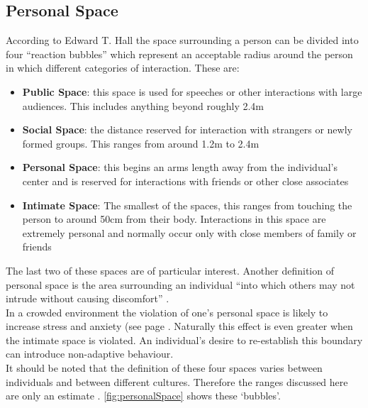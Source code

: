 \subsection{Personal Space}
\label{Res:subsec:personalSpace}
According to Edward T. Hall \cite{HiddenDimension} the space surrounding a person can be divided into four ``reaction bubbles'' which represent an acceptable radius around the person in which different categories of interaction. These are:
\begin{itemize}
  \item{\textbf{Public Space}: this space is used for speeches or other interactions with large audiences. This includes anything beyond roughly 2.4m}
  \item{\textbf{Social Space}: the distance reserved for interaction with strangers or newly formed groups. This ranges from around 1.2m to 2.4m}
  \item{\textbf{Personal Space}: this begins an arms length away from the individual's center and is reserved for interactions with friends or other close associates}
  \item{\textbf{Intimate Space}: The smallest of the spaces, this ranges from touching the person to around 50cm from their body. Interactions in this space are extremely personal and normally occur only with close members of family or friends}
\end{itemize}
The last two of these spaces are of particular interest. Another definition of personal space is the area surrounding an individual ``into which others may not intrude without causing discomfort'' \cite[pg. 424]{HandbookOfPsychology5}.\\
In a crowded environment the violation of one's personal space is likely to increase stress and anxiety (see page \pageref{subsec:personalSpace}. Naturally this effect is even greater when the intimate space is violated. An individual's desire to re-establish this boundary can introduce non-adaptive behaviour.\\
It should be noted that the definition of these four spaces varies between individuals and between different cultures. Therefore the ranges discussed here are only an estimate \cite{ProxemicsWiki}. \ref{fig:personalSpace} shows these `bubbles'.

